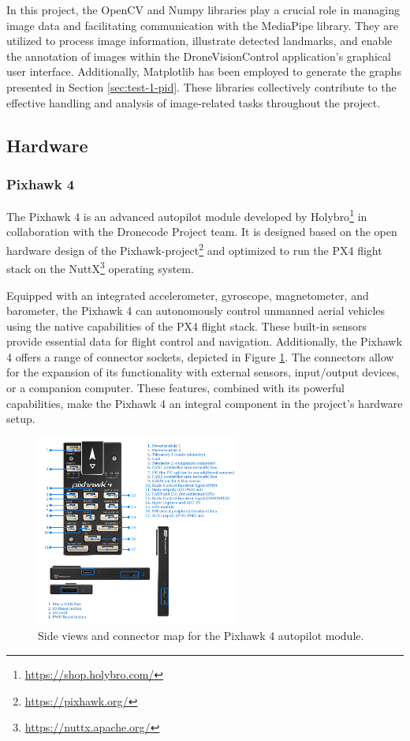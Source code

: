 In this project, the OpenCV and Numpy libraries play a crucial role in managing image data and facilitating communication with the MediaPipe library. They are utilized to process image information, illustrate detected landmarks, and enable the annotation of images within the DroneVisionControl application's graphical user interface. Additionally, Matplotlib has been employed to generate the graphs presented in Section \ref{sec:test-1-pid}. These libraries collectively contribute to the effective handling and analysis of image-related tasks throughout the project.

\subsection{Hardware}
\subsubsection{Pixhawk 4}
\label{subsec:pixhawk}

The Pixhawk 4 is an advanced autopilot module developed by Holybro\footnote{\url{https://shop.holybro.com/}} in collaboration with the Dronecode Project team. It is designed based on the open hardware design of the Pixhawk-project\footnote{\url{https://pixhawk.org/}} and optimized to run the PX4 flight stack on the NuttX\footnote{\url{https://nuttx.apache.org/}} operating system.

Equipped with an integrated accelerometer, gyroscope, magnetometer, and barometer, the Pixhawk 4 can autonomously control unmanned aerial vehicles using the native capabilities of the PX4 flight stack. These built-in sensors provide essential data for flight control and navigation.
Additionally, the Pixhawk 4 offers a range of connector sockets, depicted in Figure \ref{fig:pixhawk4}. The connectors allow for the expansion of its functionality with external sensors, input/output devices, or a companion computer.
These features, combined with its powerful capabilities, make the Pixhawk 4 an integral component in the project's hardware setup.

\begin{figure}[H]
  \centering
  \includegraphics[width=0.6\textwidth,keepaspectratio]{img/pixhawk4.jpg}
  \caption{Side views and connector map for the Pixhawk 4 autopilot module.}
  \label{fig:pixhawk4}
\end{figure}


